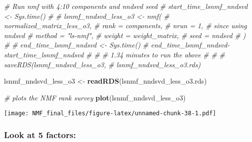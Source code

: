 \documentclass[
]{article}
\newenvironment{Shaded}{\begin{snugshade}}{\end{snugshade}}
\newcommand{\AttributeTok}[1]{\textcolor[rgb]{0.13,0.29,0.53}{#1}}
\newcommand{\CommentTok}[1]{\textcolor[rgb]{0.56,0.35,0.01}{\textit{#1}}}
\newcommand{\FunctionTok}[1]{\textcolor[rgb]{0.13,0.29,0.53}{\textbf{#1}}}
\newcommand{\NormalTok}[1]{#1}
\newcommand{\OtherTok}[1]{\textcolor[rgb]{0.56,0.35,0.01}{#1}}
\newcommand{\SpecialCharTok}[1]{\textcolor[rgb]{0.81,0.36,0.00}{\textbf{#1}}}
\newcommand{\StringTok}[1]{\textcolor[rgb]{0.31,0.60,0.02}{#1}}
\begin{document}
\begin{Shaded}
\begin{Highlighting}[]
\CommentTok{\# Run nmf with 4:10 components and nndsvd seed}
\CommentTok{\# start\_time\_lsnmf\_nndsvd \textless{}{-} Sys.time()}
\CommentTok{\# }
\CommentTok{\# lsnmf\_nndsvd\_less\_o3 \textless{}{-} nmf(}
\CommentTok{\#   normalized\_matrix\_less\_o3,}
\CommentTok{\#   rank = components,}
\CommentTok{\#   nrun = 1, \# since using nndsvd}
\CommentTok{\#   method = "ls{-}nmf",}
\CommentTok{\#   weight = weight\_matrix,}
\CommentTok{\#   seed = \textquotesingle{}nndsvd\textquotesingle{}}
\CommentTok{\# )}
\CommentTok{\# }
\CommentTok{\# end\_time\_lsnmf\_nndsvd \textless{}{-} Sys.time()}
\CommentTok{\# end\_time\_lsnmf\_nndsvd{-}start\_time\_lsnmf\_nndsvd}
\CommentTok{\# \# \# 1.34 minutes to run the above}
\CommentTok{\# \# }
\CommentTok{\# saveRDS(lsnmf\_nndsvd\_less\_o3,}
\CommentTok{\#         \textquotesingle{}lsnmf\_nndsvd\_less\_o3.rds\textquotesingle{})}

\NormalTok{lsnmf\_nndsvd\_less\_o3 }\OtherTok{\textless{}{-}} \FunctionTok{readRDS}\NormalTok{(}\StringTok{\textquotesingle{}lsnmf\_nndsvd\_less\_o3.rds\textquotesingle{}}\NormalTok{)}
\end{Highlighting}
\end{Shaded}

\begin{Shaded}
\begin{Highlighting}[]
\CommentTok{\# plots the NMF rank survey}
\FunctionTok{plot}\NormalTok{(lsnmf\_nndsvd\_less\_o3)}
\end{Highlighting}
\end{Shaded}

\texttt{[image: NMF\_final\_files/figure-latex/unnamed-chunk-38-1.pdf]}

\subsubsection{Look at 5 factors:}\label{look-at-5-factors-1}

\begin{Shaded}
\end{Shaded}
\end{document}
